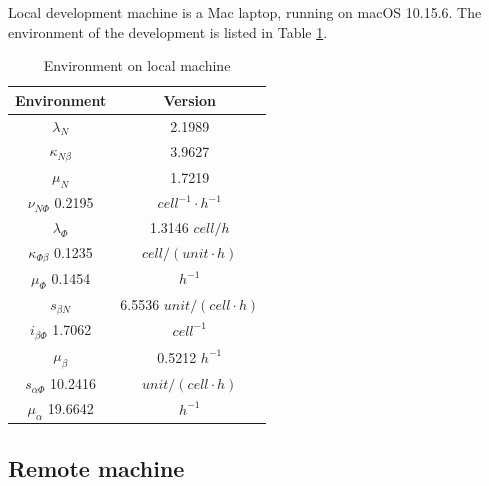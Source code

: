 \documentclass[12pt,a4paper]{report}
\begin{document}
Local development machine is a Mac laptop, running on macOS 10.15.6. The environment of the development is listed in Table \ref{table:local_macine}.

\begin{table}[h!]
    \centering
    \begin{tabular}{|c c|} 
     \hline
     Environment & Version \\ [0.5ex] 
     \hline\hline
     $\lambda_N$ & 2.1989  \\ 
     $\kappa_{N\beta}$ & 3.9627  \\
     $\mu_N$ & 1.7219 \\
     $\nu_{N\Phi}$  0.2195 & $cell^{-1}\cdotp h^{-1}$ \\
     \hline
     $\lambda_\Phi$ & 1.3146  $cell/h$ \\
     $\kappa_{\Phi\beta}$ 0.1235 & $cell/(unit\cdotp h)$ \\
     $\mu_\Phi$  0.1454 & $h^{-1}$ \\
     \hline
     $s_{\beta N}$ &6.5536  $unit/(cell\cdotp h)$ \\
     $i_{\beta\Phi}$  1.7062 & $cell^{-1}$ \\
     $\mu_\beta$ &0.5212  $h^{-1}$ \\
     \hline
     $s_{\alpha\Phi}$  10.2416 & $unit/(cell\cdotp h)$ \\
     $\mu_\alpha$ 19.6642 & $h^{-1}$ \\
    [1ex] 
     \hline
    \end{tabular}
    \caption{Environment on local machine}
    \label{table:local_macine}
\end{table}

\subsection{Remote machine}
\end{document}
